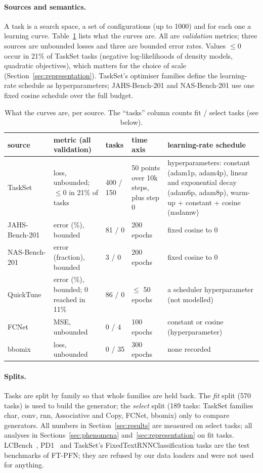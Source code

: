\documentclass[10pt]{article}
\begin{document}
\paragraph{Sources and semantics.} A task is a search space, a set of configurations (up to 1000) and for each one
a learning curve. Table~\ref{tab:data} lists what the curves are. All are \emph{validation} metrics; three
sources are unbounded losses and three are bounded error rates. Values $\le 0$ occur in 21\% of TaskSet tasks
(negative log-likelihoods of density models, quadratic objectives), which matters for the choice of scale
(Section~\ref{sec:representation}). TaskSet's optimiser families define the learning-rate schedule as
hyperparameters; JAHS-Bench-201 and NAS-Bench-201 use one fixed cosine schedule over the full budget.

\begin{table}[t]
\centering\small
\caption{What the curves are, per source. The ``tasks'' column counts fit / select tasks (see below).}
\label{tab:data}
\begin{tabular}{p{2.2cm}p{3.2cm}lp{1.4cm}p{5.0cm}}
\toprule
source & metric (all validation) & tasks & time axis & learning-rate schedule \\
\midrule
TaskSet~\cite{metz2020using} & loss, unbounded; $\le 0$ in 21\% of tasks & 400 / 150 & 50 points over 10k steps, plus step 0 &
  hyperparameters: constant (adam1p, adam4p), linear and exponential decay (adam6p, adam8p), warm-up + constant + cosine (nadamw) \\
JAHS-Bench-201~\cite{bansal2022jahs} & error (\%), bounded & 81 / 0 & 200 epochs & fixed cosine to 0 \\
NAS-Bench-201~\cite{dong2020nasbench201} & error (fraction), bounded & 3 / 0 & 200 epochs & fixed cosine to 0 \\
QuickTune~\cite{pineda2024quicktune} & error (\%), bounded; 0 reached in 11\% & 86 / 0 & $\le$ 50 epochs & a scheduler hyperparameter (not modelled) \\
FCNet~\cite{klein2019tabular} & MSE, unbounded & 0 / 4 & 100 epochs & constant or cosine (hyperparameter) \\
bbomix~\cite{salinas2022synetune} & loss, unbounded & 0 / 35 & 300 epochs & none recorded \\
\bottomrule
\end{tabular}
\end{table}

\paragraph{Splits.} Tasks are split by family so that whole families are held back. The \emph{fit} split (570 tasks)
is used to build the generator; the \emph{select} split (189 tasks: TaskSet families char, conv, rnn, Associative and
Copy, FCNet, bbomix) only to compare generators. All numbers in Section~\ref{sec:results} are measured on select
tasks; all analyses in Sections~\ref{sec:phenomena} and~\ref{sec:representation} on fit tasks. LCBench~\cite{zimmer2021autopytorch},
PD1~\cite{wang2024pretrained} and TaskSet's FixedTextRNNClassification tasks are the test benchmarks of FT-PFN; they
are refused by our data loaders and were not used for anything.
\end{document}
